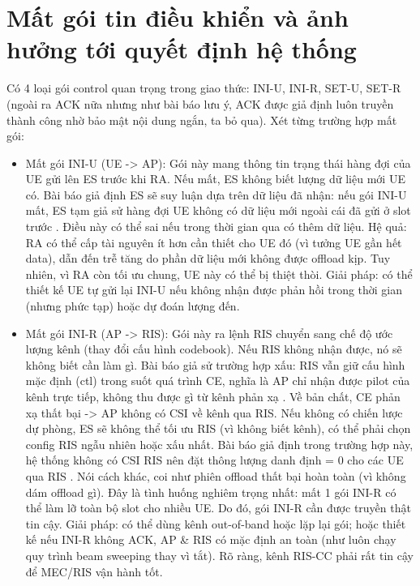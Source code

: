 \section{Mất gói tin điều khiển và ảnh hưởng tới quyết định hệ thống}
Có 4 loại gói control quan trọng trong giao thức: INI-U, INI-R, SET-U, SET-R (ngoài ra ACK nữa nhưng như bài báo lưu ý, ACK được giả định luôn truyền thành công nhờ bảo mật nội dung ngắn, ta bỏ qua). Xét từng trường hợp mất gói:

\begin{itemize}
    \item Mất gói INI-U (UE -> AP): Gói này mang thông tin trạng thái hàng đợi của UE gửi lên ES trước khi RA. Nếu mất, ES không biết lượng dữ liệu mới UE có. Bài báo giả định ES sẽ suy luận dựa trên dữ liệu đã nhận: nếu gói INI-U mất, ES tạm giả sử hàng đợi UE không có dữ liệu mới ngoài cái đã gửi ở slot trước . Điều này có thể sai nếu trong thời gian qua có thêm dữ liệu. Hệ quả: RA có thể cấp tài nguyên ít hơn cần thiết cho UE đó (vì tưởng UE gần hết data), dẫn đến trễ tăng do phần dữ liệu mới không được offload kịp. Tuy nhiên, vì RA còn tối ưu chung, UE này có thể bị thiệt thòi. Giải pháp: có thể thiết kế UE tự gửi lại INI-U nếu không nhận được phản hồi trong thời gian (nhưng phức tạp) hoặc dự đoán lượng đến.
    \item Mất gói INI-R (AP -> RIS): Gói này ra lệnh RIS chuyển sang chế độ ước lượng kênh (thay đổi cấu hình codebook). Nếu RIS không nhận được, nó sẽ không biết cần làm gì. Bài báo giả sử trường hợp xấu: RIS vẫn giữ cấu hình mặc định (ctl) trong suốt quá trình CE, nghĩa là AP chỉ nhận được pilot của kênh trực tiếp, không thu được gì từ kênh phản xạ . Về bản chất, CE phản xạ thất bại -> AP không có CSI về kênh qua RIS. Nếu không có chiến lược dự phòng, ES sẽ không thể tối ưu RIS (vì không biết kênh), có thể phải chọn config RIS ngẫu nhiên hoặc xấu nhất. Bài báo giả định trong trường hợp này, hệ thống không có CSI RIS nên đặt thông lượng danh định = 0 cho các UE qua RIS . Nói cách khác, coi như phiên offload thất bại hoàn toàn (vì không dám offload gì). Đây là tình huống nghiêm trọng nhất: mất 1 gói INI-R có thể làm lỡ toàn bộ slot cho nhiều UE. Do đó, gói INI-R cần được truyền thật tin cậy. Giải pháp: có thể dùng kênh out-of-band hoặc lặp lại gói; hoặc thiết kế nếu INI-R không ACK, AP \& RIS có mặc định an toàn (như luôn chạy quy trình beam sweeping thay vì tắt). Rõ ràng, kênh RIS-CC phải rất tin cậy để MEC/RIS vận hành tốt.

\end{itemize}
